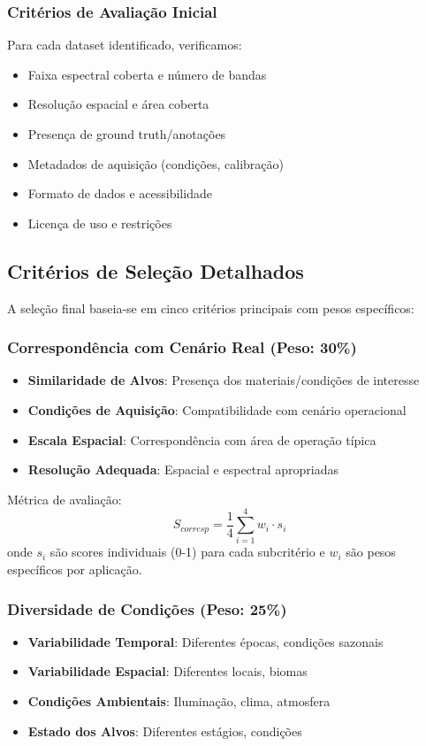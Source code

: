 \subsubsection{Critérios de Avaliação Inicial}
Para cada dataset identificado, verificamos:
\begin{itemize}
    \item Faixa espectral coberta e número de bandas
    \item Resolução espacial e área coberta
    \item Presença de ground truth/anotações
    \item Metadados de aquisição (condições, calibração)
    \item Formato de dados e acessibilidade
    \item Licença de uso e restrições
\end{itemize}

\subsection{Critérios de Seleção Detalhados}

A seleção final baseia-se em cinco critérios principais com pesos específicos:

\subsubsection{Correspondência com Cenário Real (Peso: 30\%)}
\begin{itemize}
    \item \textbf{Similaridade de Alvos}: Presença dos materiais/condições de interesse
    \item \textbf{Condições de Aquisição}: Compatibilidade com cenário operacional
    \item \textbf{Escala Espacial}: Correspondência com área de operação típica
    \item \textbf{Resolução Adequada}: Espacial e espectral apropriadas
\end{itemize}

Métrica de avaliação:
\begin{equation}
S_{corresp} = \frac{1}{4} \sum_{i=1}^{4} w_i \cdot s_i
\end{equation}
onde $s_i$ são scores individuais (0-1) para cada subcritério e $w_i$ são pesos específicos por aplicação.

\subsubsection{Diversidade de Condições (Peso: 25\%)}
\begin{itemize}
    \item \textbf{Variabilidade Temporal}: Diferentes épocas, condições sazonais
    \item \textbf{Variabilidade Espacial}: Diferentes locais, biomas
    \item \textbf{Condições Ambientais}: Iluminação, clima, atmosfera
    \item \textbf{Estado dos Alvos}: Diferentes estágios, condições
\end{itemize}

